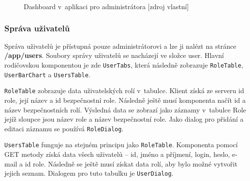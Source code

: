     \begin{figure}[h]
    \begin{center}
    \caption{Dashboard v~aplikaci pro administrátora [zdroj vlastní]}
    \label{dashboardObrazek}
    \end{center}
    \end{figure}

\subsubsection *{Správa uživatelů}

Správa uživatelů je přístupná pouze administrátorovi a lze ji nalézt na stránce \textbf{/app/users}. Soubory správy uživatelů se nacházejí ve složce user. Hlavní rodičovskou komponentou je zde \texttt{UserTabs}, která následně zobrazuje \texttt{RoleTable}, \texttt{UserBarChart} a \texttt{UsersTable}. 

\texttt{RoleTable} zobrazuje data uživatelských rolí v~tabulce. Klient získá ze serveru id role, její název a id bezpečnostní role. Následně ještě musí komponenta načít id a název bezpečnostních rolí. Výsledná data se zobrazí jako záznamy v~tabulce Role jejíž sloupce jsou název role a název bezpečnostní role. Jako dialog pro přidání a editaci záznamu se používá \texttt{RoleDialog}.

\texttt{UsersTable} funguje na stejném principu jako \texttt{RoleTable}. Komponenta pomocí GET metody získá data všech uživatelů – id, jméno a příjmení, login, heslo, e-mail a id role. Následně se ještě musí získat data rolí, aby bylo možné vytvořit jejich seznam. Dialogem pro tuto tabulku je \texttt{UserDialog}.

